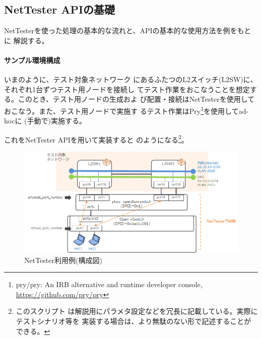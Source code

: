   \subsection{NetTester APIの基礎}
  \label{sec:nettester-api-basics}

NetTesterを使った処理の基本的な流れと、APIの基本的な使用方法を例をもとに
解説する。

\paragraph{サンプル環境構成}

いまのように、テスト対象ネットワーク
にあるふたつのL2スイッチ(L2SW)に、それぞれ1台ずつテスト用ノードを接続し
てテスト作業をおこなうことを想定する。このとき、テスト用ノードの生成およ
び配置・接続はNetTesterを使用しておこなう。また、テスト用ノードで実施す
るテスト作業はPry\footnote{pry/pry: An IRB alternative and runtime
developer console, \url{https://github.com/pry/pry}}を使用してad-hocに
(手動で)実施する。

これをNetTester APIを用いて実装すると
のようになる\footnote{このスクリプト
は解説用にパラメタ設定などを冗長に記載している。実際にテストシナリオ等を
実装する場合は、より無駄のない形で記述することができる。}。

\begin{figure}[h]
 \centering
 \includegraphics[scale=0.75]{img/nettester-basic-example.png}
 \caption{NetTester利用例(構成図)}
 \label{fig:nettester-basic-example}
\end{figure}

